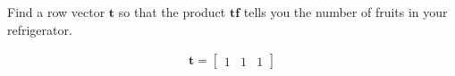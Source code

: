 Find a row vector $\boldsymbol{t}$ so that the product $\boldsymbol{tf}$ tells you the number of fruits in your refrigerator.

\begin{solution}
\begin{align*}
    \boldsymbol{t} = \begin{bmatrix}
        1 & 1 & 1
    \end{bmatrix}
\end{align*}
\end{solution}